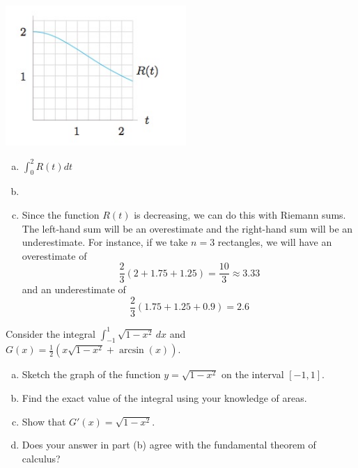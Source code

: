 \documentclass[11pt]{exam}
\begin{document}
\begin{questions}
\begin{multicols}{2}
    \includegraphics[width=2.7in]{no21graph.jpg}
  \end{multicols}
  \begin{solution}
    \begin{enumerate}[(a)]
    \item \(\int_0^2 R(t) dt\)
    \item 
    \item Since the function \(R(t)\) is decreasing, we can do this
      with Riemann sums. The left-hand sum will be an overestimate and
      the right-hand sum will be an underestimate. For instance, if we
      take \(n=3\) rectangles, we will have an overestimate of \[
        \frac{2}{3}\left( 2 + 1.75+1.25 \right) = \frac{10}{3} \approx 3.33
      \]
      and an underestimate of \[
       \frac{2}{3}\left( 1.75 + 1.25 + 0.9 \right) = 2.6
      \]
    \end{enumerate}
  \end{solution}
\question Consider the integral $\displaystyle\int_{-1}^1 \sqrt{1-x^2} \, dx$ and $\displaystyle G(x) = \frac{1}{2}\left(x\sqrt{1-x^2}+\arcsin(x)\right)$.
\begin{enumerate}[(a)]
	\item Sketch the graph of the function $y = \sqrt{1-x^2}$ on the interval $[-1,1]$.
	\item Find the exact value of the integral using your knowledge of areas.
	\item Show that $G'(x)=\sqrt{1-x^2}$.
	\item Does your answer in part (b) agree with the fundamental theorem of calculus? 
\end{enumerate}	
\begin{solution}

\end{solution}
\end{questions}
\end{document}
